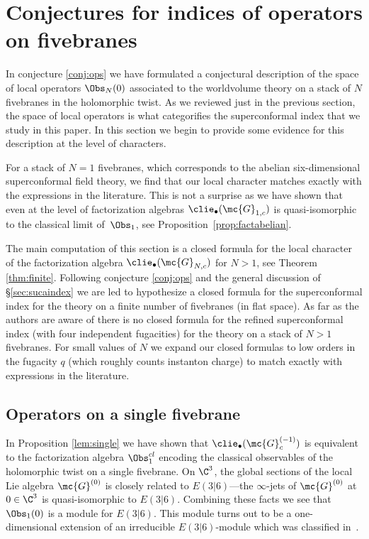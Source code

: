 \section{Conjectures for indices of operators on fivebranes}
\label{s:finite}

In conjecture \ref{conj:ops} we have formulated a conjectural description of the space of local operators $\Obs_{N}(0)$ associated to the worldvolume theory on a stack of $N$ fivebranes in the holomorphic twist.
As we reviewed just in the previous section, the space of local operators is what categorifies the superconformal index that we study in this paper.
In this section we begin to provide some evidence for this description at the level of characters.


For a stack of $N=1$ fivebranes, which corresponds to the abelian six-dimensional superconformal field theory, we find that our local character matches exactly with the expressions in the literature. 
This is not a surprise as we have shown that even at the level of factorization algebras $\clie_\bullet(\mc{G}_{1,c})$ is quasi-isomorphic to the classical limit of~$\Obs_1$, see Proposition~\ref{prop:factabelian}.

The main computation of this section is a closed formula for the local character of the factorization algebra $\clie_\bullet(\mc{G}_{N,c})$ for $N > 1$, see Theorem \ref{thm:finite}. 
Following conjecture \ref{conj:ops} and the general discussion of \S \ref{sec:sucaindex} we are led to hypothesize a closed formula for the superconformal index for the theory on a finite number of fivebranes (in flat space).
As far as the authors are aware of there is no closed formula for the refined superconformal index (with four independent fugacities) for the theory on a stack of $N > 1$ fivebranes.
For small values of $N$ we expand our closed formulas to low orders in the fugacity $q$ (which roughly counts instanton charge) to match exactly with expressions in the literature. 

\subsection{Operators on a single fivebrane}


In Proposition \ref{lem:single} we have shown that $\clie_\bullet (\mc{G}_{c}^{(-1)})$ is equivalent to the factorization algebra $\Obs^{cl}_{1}$ encoding the classical observables  of the holomorphic twist on a single fivebrane.
On $\C^3$, the global sections of the local Lie algebra $\mc{G}^{(0)}$ is closely related to $E(3|6)$---the $\infty$-jets of $\mc{G}^{(0)}$ at $0 \in \C^3$ is quasi-isomorphic to $E(3|6)$.
Combining these facts we see that $\Obs_{1}(0)$ is a module for $E(3|6)$. 
This module turns out to be a one-dimensional extension of an irreducible $E(3|6)$-module which was classified in~\cite{KR2}. 

